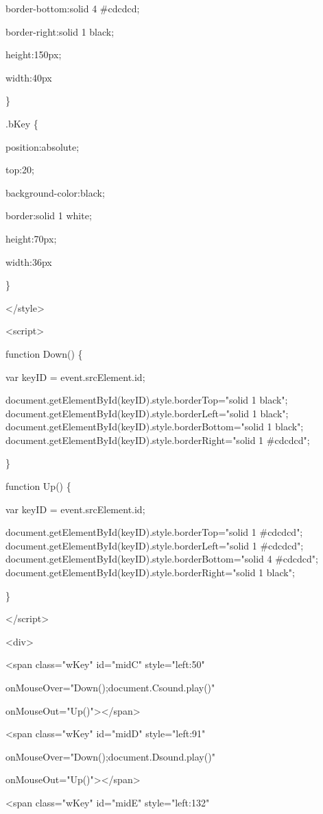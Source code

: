 \documentclass[
]{article}
\begin{document}
border-bottom:solid 4 \#cdcdcd;

border-right:solid 1 black;

height:150px;

width:40px

\}

.bKey \{

position:absolute;

top:20;

background-color:black;

border:solid 1 white;

height:70px;

width:36px

\}

\textless/style\textgreater{}

\textless script\textgreater{}

function Down() \{

var keyID = event.srcElement.id;

document.getElementById(keyID).style.borderTop="solid 1 black";
document.getElementById(keyID).style.borderLeft="solid 1 black";
document.getElementById(keyID).style.borderBottom="solid 1 black";
document.getElementById(keyID).style.borderRight="solid 1 \#cdcdcd";

\}

function Up() \{

var keyID = event.srcElement.id;

document.getElementById(keyID).style.borderTop="solid 1 \#cdcdcd";
document.getElementById(keyID).style.borderLeft="solid 1 \#cdcdcd";
document.getElementById(keyID).style.borderBottom="solid 4 \#cdcdcd";
document.getElementById(keyID).style.borderRight="solid 1 black";

\}

\textless/script\textgreater{}

\textless div\textgreater{}

\textless span class="wKey" id="midC" style="left:50"

onMouseOver="Down();document.Csound.play()"

onMouseOut="Up()"\textgreater\textless/span\textgreater{}

\textless span class="wKey" id="midD" style="left:91"

onMouseOver="Down();document.Dsound.play()"

onMouseOut="Up()"\textgreater\textless/span\textgreater{}

\textless span class="wKey" id="midE" style="left:132"
\end{document}
